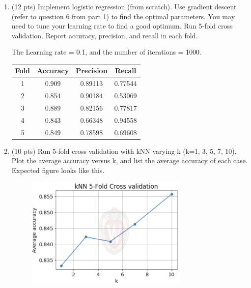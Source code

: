 \documentclass[a4paper]{article}
\theoremstyle{definition}
\newenvironment{soln}{
    \leavevmode\color{blue}\ignorespaces
}{}
\begin{document}
\begin{enumerate}
	\item (12 pts) Implement logistic regression (from scratch). Use gradient descent (refer to question 6 from part 1) to find the optimal parameters. You may need to tune your learning rate to find a good optimum. Run 5-fold cross validation. Report accuracy, precision, and recall in each fold.
	
	\begin{soln}
            The Learning rate = 0.1, and the number of iterations = 1000.
             \begin{table}[H]
             \begin{soln}
                \begin{center}
                \begin{tabular}{c|c|c|c}
                \hline
                \textbf{Fold} & \textbf{Accuracy} & \textbf{Precision} & \textbf{Recall}\\ \hline
                1 & 0.909 & 0.89113 & 0.77544 \\ 
                2 & 0.854 & 0.90184 & 0.53069 \\ 
                3 & 0.889 & 0.82156 & 0.77817 \\ 
                4 & 0.843 & 0.66348 & 0.94558 \\ 
                5 & 0.849 & 0.78598 & 0.69608 \\ \hline
                \end{tabular}
                \end{center}
            \end{soln}
             \end{table}
        \end{soln}
	
	\item (10 pts) Run 5-fold cross validation with kNN varying k (k=1, 3, 5, 7, 10). Plot the average accuracy versus k, and list the average accuracy of each case. \\
	Expected figure looks like this.
	\begin{figure}[h]
		\centering
		\includegraphics[width=8cm]{needed/knn.png}
	\end{figure}
	

\end{enumerate}
\end{document}
